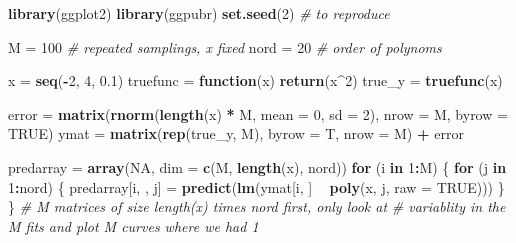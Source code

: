 \documentclass[]{article}
\newenvironment{Shaded}{\begin{snugshade}}{\end{snugshade}}
\newcommand{\CommentTok}[1]{\textcolor[rgb]{0.56,0.35,0.01}{\textit{#1}}}
\newcommand{\ControlFlowTok}[1]{\textcolor[rgb]{0.13,0.29,0.53}{\textbf{#1}}}
\newcommand{\DataTypeTok}[1]{\textcolor[rgb]{0.13,0.29,0.53}{#1}}
\newcommand{\DecValTok}[1]{\textcolor[rgb]{0.00,0.00,0.81}{#1}}
\newcommand{\FloatTok}[1]{\textcolor[rgb]{0.00,0.00,0.81}{#1}}
\newcommand{\KeywordTok}[1]{\textcolor[rgb]{0.13,0.29,0.53}{\textbf{#1}}}
\newcommand{\NormalTok}[1]{#1}
\newcommand{\OperatorTok}[1]{\textcolor[rgb]{0.81,0.36,0.00}{\textbf{#1}}}
\newcommand{\OtherTok}[1]{\textcolor[rgb]{0.56,0.35,0.01}{#1}}
\newcommand{\StringTok}[1]{\textcolor[rgb]{0.31,0.60,0.02}{#1}}
\begin{document}
\begin{Shaded}
\begin{Highlighting}[]
\KeywordTok{library}\NormalTok{(ggplot2)}
\KeywordTok{library}\NormalTok{(ggpubr)}
\KeywordTok{set.seed}\NormalTok{(}\DecValTok{2}\NormalTok{)  }\CommentTok{# to reproduce}

\NormalTok{M =}\StringTok{ }\DecValTok{100}  \CommentTok{# repeated samplings, x fixed }
\NormalTok{nord =}\StringTok{ }\DecValTok{20}  \CommentTok{# order of polynoms}


\NormalTok{x =}\StringTok{ }\KeywordTok{seq}\NormalTok{(}\OperatorTok{-}\DecValTok{2}\NormalTok{, }\DecValTok{4}\NormalTok{, }\FloatTok{0.1}\NormalTok{)}
\NormalTok{truefunc =}\StringTok{ }\ControlFlowTok{function}\NormalTok{(x) }\KeywordTok{return}\NormalTok{(x}\OperatorTok{^}\DecValTok{2}\NormalTok{)}
\NormalTok{true_y =}\StringTok{ }\KeywordTok{truefunc}\NormalTok{(x)}

\NormalTok{error =}\StringTok{ }\KeywordTok{matrix}\NormalTok{(}\KeywordTok{rnorm}\NormalTok{(}\KeywordTok{length}\NormalTok{(x) }\OperatorTok{*}\StringTok{ }\NormalTok{M, }\DataTypeTok{mean =} \DecValTok{0}\NormalTok{, }\DataTypeTok{sd =} \DecValTok{2}\NormalTok{), }\DataTypeTok{nrow =}\NormalTok{ M, }\DataTypeTok{byrow =} \OtherTok{TRUE}\NormalTok{)}
\NormalTok{ymat =}\StringTok{ }\KeywordTok{matrix}\NormalTok{(}\KeywordTok{rep}\NormalTok{(true_y, M), }\DataTypeTok{byrow =}\NormalTok{ T, }\DataTypeTok{nrow =}\NormalTok{ M) }\OperatorTok{+}\StringTok{ }\NormalTok{error}

\NormalTok{predarray =}\StringTok{ }\KeywordTok{array}\NormalTok{(}\OtherTok{NA}\NormalTok{, }\DataTypeTok{dim =} \KeywordTok{c}\NormalTok{(M, }\KeywordTok{length}\NormalTok{(x), nord))}
\ControlFlowTok{for}\NormalTok{ (i }\ControlFlowTok{in} \DecValTok{1}\OperatorTok{:}\NormalTok{M) \{}
    \ControlFlowTok{for}\NormalTok{ (j }\ControlFlowTok{in} \DecValTok{1}\OperatorTok{:}\NormalTok{nord) \{}
\NormalTok{        predarray[i, , j] =}\StringTok{ }\KeywordTok{predict}\NormalTok{(}\KeywordTok{lm}\NormalTok{(ymat[i, ] }\OperatorTok{~}\StringTok{ }\KeywordTok{poly}\NormalTok{(x, j, }\DataTypeTok{raw =} \OtherTok{TRUE}\NormalTok{)))}
\NormalTok{    \}}
\NormalTok{\}}
\CommentTok{# M matrices of size length(x) times nord first, only look at}
\CommentTok{# variablity in the M fits and plot M curves where we had 1}


\end{Highlighting}
\end{Shaded}
\end{document}
